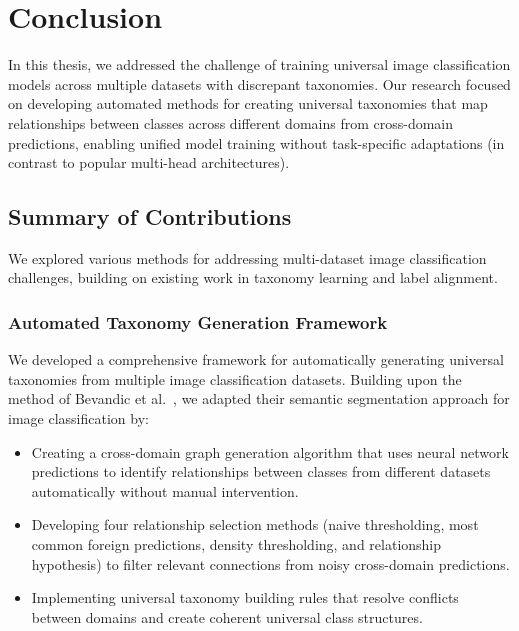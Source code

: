 \chapter{Conclusion}

In this thesis,
we addressed the challenge of training universal image classification models
across multiple datasets with discrepant taxonomies.
Our research focused on developing automated methods for creating universal taxonomies
that map relationships between classes across different domains
from cross-domain predictions,
enabling unified model training without task-specific adaptations
(in contrast to popular multi-head architectures).

\section{Summary of Contributions}

We explored various methods for addressing multi-dataset image classification challenges,
building on existing work in taxonomy learning and label alignment.

\subsection{Automated Taxonomy Generation Framework}

We developed a comprehensive framework for automatically generating universal taxonomies
from multiple image classification datasets.
Building upon the method of Bevandic et al.~\cite{bevandic_automatic_2022,bevandic_weakly_2024},
we adapted their semantic segmentation approach for image classification by:

\begin{itemize}
      \item Creating a cross-domain graph generation algorithm that uses neural network predictions
            to identify relationships between classes from different datasets automatically
            without manual intervention.
      \item Developing four relationship selection methods
            (naive thresholding, most common foreign predictions, density thresholding,
            and relationship hypothesis) to filter relevant connections from noisy cross-domain predictions.
      \item Implementing universal taxonomy building rules that resolve conflicts
            between domains and create coherent universal class structures.
\end{itemize}

